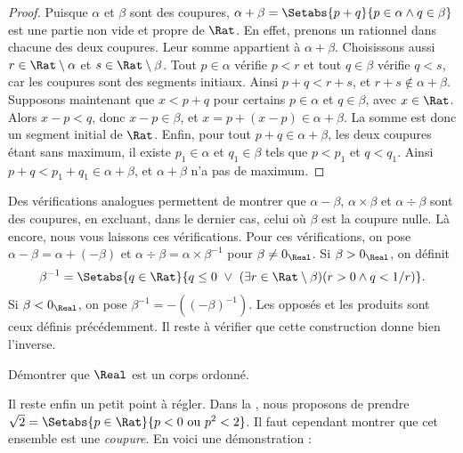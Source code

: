 \documentclass[../../../include/open-logic-section]{subfiles}
\begin{document}
\begin{proof}
Puisque $\alpha$ et $\beta$ sont des coupures,
$\alpha + \beta = \Setabs{p + q}{p \in \alpha \land q \in \beta}$
est une partie non vide et propre de $\Rat$. En effet, prenons
un rationnel dans chacune des deux coupures. Leur somme appartient
à $\alpha+\beta$. Choisissons aussi $r\in\Rat\setminus\alpha$ et
$s\in\Rat\setminus\beta$. Tout $p\in\alpha$ vérifie $p<r$ et tout
$q\in\beta$ vérifie $q<s$, car les coupures sont des segments initiaux.
Ainsi $p+q<r+s$, et $r+s\notin\alpha+\beta$.
Supposons maintenant que $x < p + q$ pour certains $p \in \alpha$ et
$q \in \beta$, avec $x\in\Rat$. Alors $x - p < q$, donc
$x - p \in \beta$, et $x = p + (x - p) \in \alpha + \beta$.
La somme est donc un segment initial de $\Rat$.
Enfin, pour tout $p + q \in \alpha + \beta$, les deux coupures étant
sans maximum, il existe $p_1 \in \alpha$ et $q_1 \in \beta$ tels que
$p < p_1$ et $q < q_1$. Ainsi
$p + q < p_1 + q_1 \in \alpha + \beta$, et $\alpha+\beta$ n'a pas de maximum.
\end{proof}

Des vérifications analogues permettent de montrer que $\alpha - \beta$,
$\alpha \times \beta$ et $\alpha \div \beta$ sont des coupures, en
excluant, dans le dernier cas, celui où $\beta$ est la coupure nulle.
Là encore, nous vous laissons ces vérifications.
%
Pour ces vérifications, on pose $\alpha-\beta=\alpha+(-\beta)$
et $\alpha\div\beta=\alpha\times\beta^{-1}$ pour $\beta\neq0_\Real$.
Si $\beta>0_\Real$, on définit
%
%
\[
\beta^{-1}=\Setabs{q\in\Rat}{q\leq0\ \lor\
(\exists r\in\Rat\setminus\beta)(r>0\land q<1/r)}.
\]
Si $\beta<0_\Real$, on pose $\beta^{-1}=-((-\beta)^{-1})$.
Les opposés et les produits sont ceux définis précédemment. Il reste à vérifier
que cette construction donne bien l'inverse.
%

\begin{prob}
Démontrer que $\Real$ est un corps ordonné.
\end{prob}

Il reste enfin un petit point à régler. Dans la ,
nous proposons de prendre
$\sqrt{2}=\Setabs{p \in \Rat}{p < 0 \text{ ou }p^2 < 2}$.
Il faut cependant montrer que cet ensemble est une \emph{coupure}.
En voici une démonstration :
\end{document}
